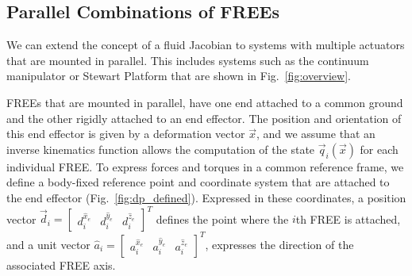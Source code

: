 \subsection{Parallel Combinations of FREEs}
\label{sec:parallelActuators}
We can extend the concept of a fluid Jacobian to systems with multiple actuators that are mounted in parallel.
This includes systems such as the continuum manipulator or Stewart Platform that are shown in Fig.~\ref{fig:overview}.


FREEs that are mounted in parallel, have one end attached to a common ground and the other rigidly attached to an end effector.
The position and orientation of this end effector is given by a deformation vector $\vec{x}$, and we assume that an inverse kinematics function allows the computation of the state $\vec{q}_i \left(\vec{x}\right)$ for each individual FREE.
To express forces and torques in a common reference frame, we define a body-fixed reference point and coordinate system that are attached to the end effector (Fig.~\ref{fig:dp_defined}). 
Expressed in these coordinates, a position vector ${\vec{d}_i = \begin{bmatrix} d_i^{\hat{x}_e} & d_i^{\hat{y}_e} & d_i^{\hat{z}_e} \end{bmatrix}^T}$ defines the point where the $i$th FREE is attached, and a unit vector ${\hat{a}_i = \begin{bmatrix} a_i^{\hat{x}_e} & a_i^{\hat{y}_e} & a_i^{\hat{z}_e} \end{bmatrix}^T}$, expresses the direction of the associated FREE axis.


